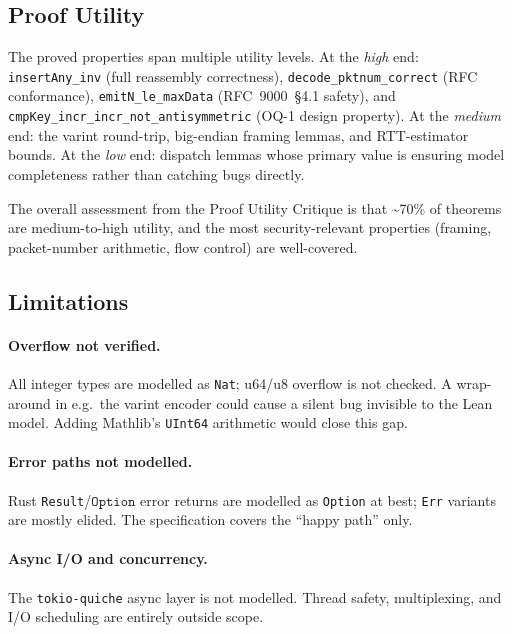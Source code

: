 \documentclass[sigconf,10pt]{acmart}
\begin{document}
\subsection{Proof Utility}

The proved properties span multiple utility levels.
At the \emph{high} end: \texttt{insertAny\_inv} (full reassembly
correctness), \texttt{decode\_pktnum\_correct} (RFC conformance),
\texttt{emitN\_le\_maxData} (RFC~9000~\S 4.1 safety), and
\texttt{cmpKey\_incr\_incr\_not\_antisymmetric} (OQ-1 design property).
At the \emph{medium} end: the varint round-trip, big-endian framing
lemmas, and RTT-estimator bounds.
At the \emph{low} end: dispatch lemmas whose primary value is ensuring
model completeness rather than catching bugs directly.

The overall assessment from the Proof Utility Critique is that
\textasciitilde{}70\% of theorems are medium-to-high utility, and the
most security-relevant properties (framing, packet-number arithmetic,
flow control) are well-covered.

\subsection{Limitations}
\label{sec:limitations}

\paragraph{Overflow not verified.}
All integer types are modelled as \texttt{Nat}; u64/u8 overflow is not
checked.
A wrap-around in e.g.\ the varint encoder could cause a silent bug
invisible to the Lean model.
Adding Mathlib's \texttt{UInt64} arithmetic would close this gap.

\paragraph{Error paths not modelled.}
Rust \texttt{Result}/$\texttt{Option}$ error returns are modelled as
\texttt{Option} at best; \texttt{Err} variants are mostly elided.
The specification covers the ``happy path'' only.

\paragraph{Async I/O and concurrency.}
The \texttt{tokio-quiche} async layer is not modelled.
Thread safety, multiplexing, and I/O scheduling are entirely outside
scope.
\end{document}
